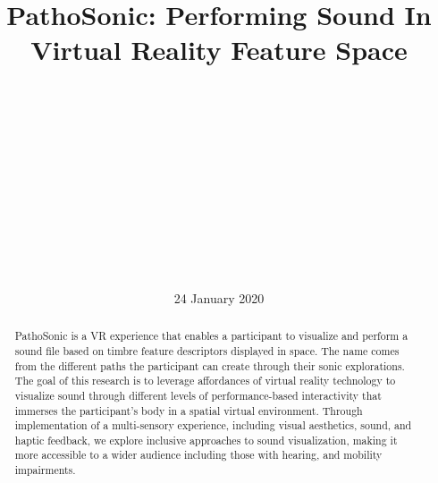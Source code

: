 \documentclass{nime-alternate}
\begin{document}
\conferenceinfo{}

\title{PathoSonic: Performing Sound In Virtual Reality Feature Space}

\label{key}

\author{
\alignauthor

\\
       \\
       \\
       \\
       \\

\alignauthor
{}\\
       \\
       \\
       \\
       \\

}

\date{24 January 2020}
\maketitle

\begin{abstract}
PathoSonic is a VR experience that enables a participant to visualize and perform a sound file based on timbre feature descriptors displayed in space. The name comes from the different paths the participant can create through their sonic explorations. The goal of this research is to leverage affordances of virtual reality technology to visualize sound through different levels of performance-based interactivity that immerses the participant's body in a spatial virtual environment. Through implementation of a multi-sensory experience, including visual aesthetics, sound, and haptic feedback, we explore inclusive approaches to sound visualization, making it more accessible to a wider audience including those with hearing, and mobility impairments. 

\end{abstract}
\end{document}
